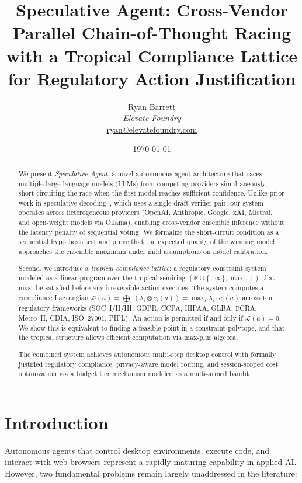 \documentclass[11pt,twocolumn]{article}
\title{\textbf{Speculative Agent: Cross-Vendor Parallel Chain-of-Thought Racing\\
with a Tropical Compliance Lattice for Regulatory Action Justification}}
\author{
  Ryan Barrett\\
  \textit{Elevate Foundry}\\
  \href{mailto:ryan@elevatefoundry.com}{ryan@elevatefoundry.com}
}
\date{\today}
\newcommand{\R}{\mathbb{R}}
\begin{document}
\maketitle

\begin{abstract}
We present \textit{Speculative Agent}, a novel autonomous agent architecture that
races multiple large language models (LLMs) from competing providers simultaneously,
short-circuiting the race when the first model reaches sufficient confidence.
Unlike prior work in speculative decoding~\cite{leviathan2023fast}, which uses a
single draft-verifier pair, our system operates across heterogeneous providers
(OpenAI, Anthropic, Google, xAI, Mistral, and open-weight models via Ollama),
enabling cross-vendor ensemble inference without the latency penalty of sequential
voting. We formalize the short-circuit condition as a sequential hypothesis test and
prove that the expected quality of the winning model approaches the ensemble maximum
under mild assumptions on model calibration.

Second, we introduce a \emph{tropical compliance lattice}: a regulatory constraint
system modeled as a linear program over the tropical semiring $(\R \cup \{-\infty\},
\max, +)$ that must be satisfied before any irreversible action executes. The system computes a compliance Lagrangian $\mathcal{L}(a) = \bigoplus_i (\lambda_i \otimes c_i(a))
= \max_i \lambda_i \cdot c_i(a)$ across ten
regulatory frameworks (SOC~I/II/III, GDPR, CCPA, HIPAA, GLBA, FCRA, Metro~II, CDIA,
ISO~27001, PIPL). An action is permitted if and only if $\mathcal{L}(a) = 0$. We show this
is equivalent to finding a feasible point in a constraint polytope, and that the
tropical structure allows efficient computation via max-plus algebra.

The combined system achieves autonomous multi-step desktop control with formally
justified regulatory compliance, privacy-aware model routing, and session-scoped
cost optimization via a budget tier mechanism modeled as a multi-armed bandit.
\end{abstract}

\section{Introduction}

Autonomous agents that control desktop environments, execute code, and interact with
web browsers represent a rapidly maturing capability in applied AI. However, two
fundamental problems remain largely unaddressed in the literature:
\end{document}
